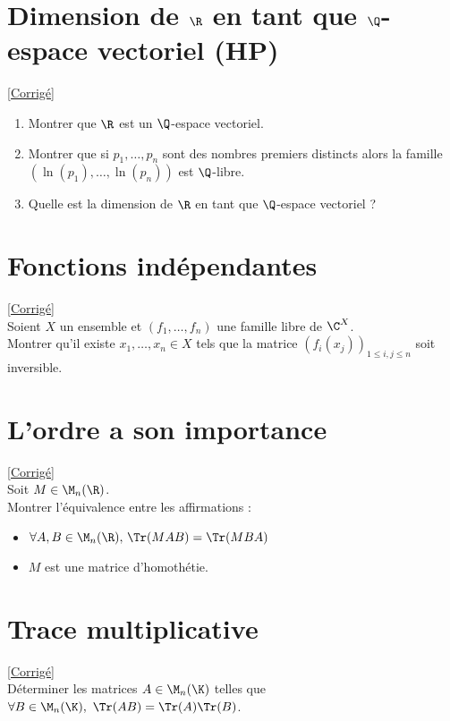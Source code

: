 \documentclass[8pt]{book}
\begin{document}
\section{Dimension de $\R$ en tant que $\Q$-espace vectoriel  (HP)}
\label{Dimension de R en tant que Q espace vectoriel }
\textcolor{blue}{\hyperref[Dimension de R en tant que Q espace vectoriel corrigé]{[Corrigé]}}\\
\begin{enumerate}[leftmargin=*]
	\item Montrer que $\R$ est un $\Q$-espace vectoriel.
	\item Montrer que si $p_1,\dots,p_n$ sont des nombres premiers distincts alors la famille $(\ln(p_1),\dots,\ln(p_n))$ est $\Q$-libre.
	\item Quelle est la dimension de $\R$ en tant que $\Q$-espace vectoriel ?
\end{enumerate}

\section{Fonctions indépendantes }
\label{Fonctions indépendantes}
\textcolor{blue}{\hyperref[Fonctions indépendantes corrigé]{[Corrigé]}}\\
Soient $X$ un ensemble et $(f_1,\dots,f_n)$ une famille libre de $\C^X$.\\
Montrer qu'il existe $x_1,\dots,x_n\in X$ tels que la matrice $(f_i(x_j))_{1\leq i,j\leq n}$ soit inversible.

\section{L'ordre a son importance }
\label{L'ordre a son importance}
\textcolor{blue}{\hyperref[L'ordre a son importance corrigé]{[Corrigé]}}\\
Soit $M\in \M_n(\R)$.\\ Montrer l'équivalence entre les affirmations :
\begin{itemize}
	\item $\forall A,B\in\M_n(\R), \,\Tr(MAB)=\Tr(MBA)$
	\item $M$ est une matrice d'homothétie.
\end{itemize}

\section{Trace multiplicative }
\label{Trace multiplicative}
\textcolor{blue}{\hyperref[Trace multiplicative corrigé]{[Corrigé]}}\\
Déterminer les matrices $A\in \M_n(\K)$ telles que $\forall B\in \M_n(\K),\ \Tr(AB)=\Tr(A)\Tr(B)$.
\end{document}
